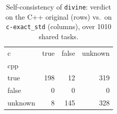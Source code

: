 \begin{table}[t]
  \centering
  \caption{Self-consistency of \texttt{divine}: verdict on the C++ original (rows) vs.\ on \texttt{c-exact_std} (columns), over 1010 shared tasks.}
  \label{tab:selfpair-divine-c-exact_std}
\begin{tabular}{lrrr}
\toprule
c & true & false & unknown \\
cpp &  &  &  \\
\midrule
true & 198 & 12 & 319 \\
false & 0 & 0 & 0 \\
unknown & 8 & 145 & 328 \\
\bottomrule
\end{tabular}
\end{table}
